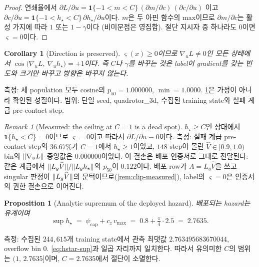 \documentclass[11pt]{article}
\theoremstyle{plain}
\newtheorem{proposition}[theorem]{Proposition}
\newtheorem{corollary}[theorem]{Corollary}
\theoremstyle{definition}
\theoremstyle{remark}
\newtheorem{remark}[theorem]{Remark}
\DeclarePairedDelimiter{\norm}{\lVert}{\rVert}
\newcommand{\Vhat}{\widehat V}
\newcommand{\Lg}{L_g}
\newcommand{\grad}{\nabla}
\begin{document}
\begin{proof}
연쇄율에서 $\partial L/\partial u = \mathbf 1\{-1<m<C\}\,(\partial m/\partial c)\,(\partial c/\partial u)$
이고 $\partial c/\partial u = \mathbf 1\{-1<h_\star<C\}\,\partial h_\star/\partial u$이다.
$m$은 두 아핀 함수의 max이므로 $\partial m/\partial c$는 활성 가지에 따라 $1$ 또는 $1-\gamma$이다
(비미분점은 영집합). 절단 지시자 중 하나라도 $0$이면 $\varsigma=0$이다.
\end{proof}

\begin{corollary}[Direction is preserved]\label{cor:label-dir}
$\varsigma(x)\ge0$이므로 $\grad_u L\ne0$인 모든 상태에서
$\cos\big(\grad_u L,\ \grad_u h_\star\big) = +1$이다. 즉 $C$나 $\gamma$를 바꾸는 것은 label이
gradient를 갖는 \emph{빈도와 크기}만 바꾸고 \emph{방향}은 바꾸지 않는다.
\end{corollary}

\noindent
측정: 세 population 모두 cosine의 $p_{50}=1.000000$, $\min=1.0000$. \cref{cor:label-dir}은
가정이 아니라 확인된 성질이다. 범위: 단일 seed, quadrotor\_3d, 수집된 training state와 실패 계급
pre-contact step.

\begin{remark}[Measured: the ceiling at $C=1$ is a dead spot]\label{rem:C1-dead}
$h_\star\ge C$인 상태에서 $\mathbf1\{h_\star<C\}=0$이므로 $\varsigma=0$이고 따라서
$\partial L/\partial u\equiv0$이다. 측정: 실패 계급 pre-contact step의 $36.67\%$가 $C=1$에서
$h_\star\ge1$이었고, $148$ step이 몰린 $\Vhat\in[0.9,1.0)$ bin의 $\norm{\grad_u L}$ 중앙값은
$0.000000$이었다. 이 결손은 배포 인증서로 그대로 전달된다: 같은 계급에서
$\norm{\Lg\Vhat}/\norm{\Lg h_\star}$의 $p_{50}$이 $0.122$이다. 배포 row가 $A=\Lg\Vhat$을 쓰고
singular 판정이 $\norm{\Lg\Vhat}$의 문턱이므로(\cref{rem:clip-measured}), label의 $\varsigma=0$은
인증서의 권한 결손으로 이어진다.
\end{remark}

\begin{proposition}[Analytic supremum of the deployed hazard]\label{prop:hstar-sup}
배포되는 hazard는 유계이며
\begin{equation}
  \sup h_\star \;=\; \psi_{\mathrm{cap}} + c_z\,v_{\max}
              \;=\; 0.8 + \tfrac{\pi}{4}\cdot 2.5 \;=\; 2.7635 .
  \label{eq:hstar-sup}
\end{equation}
\end{proposition}

\noindent
측정: 수집된 $244{,}615$개 training state에서 관측 최댓값 $2.763495683670044$, overflow bin $0$.
\eqref{eq:hstar-sup}과 일곱 자리까지 일치한다. 따라서 유의미한 $C$의 범위는 $(1,\,2.7635]$이며,
$C=2.7635$에서 절단이 소멸한다.
\end{document}
